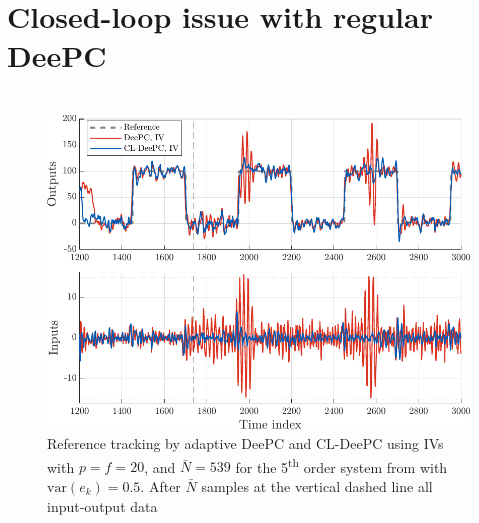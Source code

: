 \section{Closed-loop issue with regular \ac{DeePC}}\label{sec:CL_ID_issue}

\begin{align}
    
\end{align}

\begin{figure}
\begin{center}
\includegraphics[width=\columnwidth]{results/figures/fig_prob_sol.pdf}    %
\caption{Reference tracking by adaptive \ac{DeePC} and \ac{CL-DeePC} using \ac{IVs} with $p=f=20$, and $\bar{N}=539$ for the 5\textsuperscript{th} order system from \cite{Favoreel1999} with $\text{var}(e_k)=0.5$. After $\bar{N}$ samples at the vertical dashed line all input-output data }  %
\label{fig:CL_Problem_Solution}                                 %
\end{center}                                 %
\end{figure}